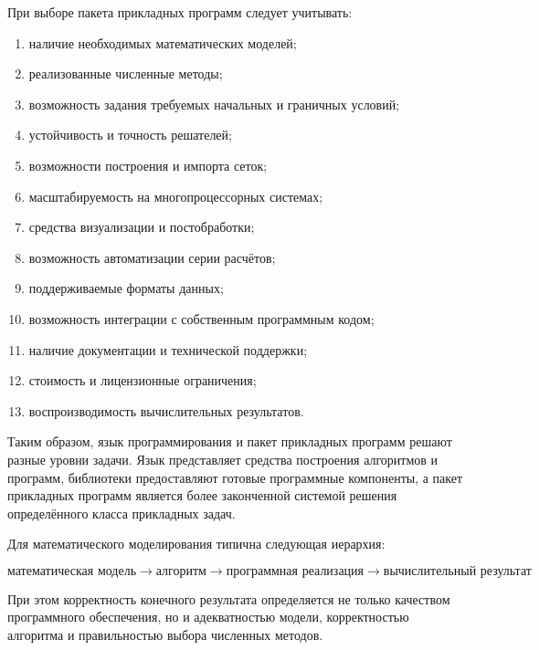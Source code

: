 При выборе пакета прикладных программ следует учитывать:
\begin{enumerate}
	\item наличие необходимых математических моделей;
	\item реализованные численные методы;
	\item возможность задания требуемых начальных и граничных условий;
	\item устойчивость и точность решателей;
	\item возможности построения и импорта сеток;
	\item масштабируемость на многопроцессорных системах;
	\item средства визуализации и постобработки;
	\item возможность автоматизации серии расчётов;
	\item поддерживаемые форматы данных;
	\item возможность интеграции с собственным программным кодом;
	\item наличие документации и технической поддержки;
	\item стоимость и лицензионные ограничения;
	\item воспроизводимость вычислительных результатов.
\end{enumerate}

Таким образом, язык программирования и пакет прикладных программ решают разные уровни задачи. Язык представляет средства построения алгоритмов и программ, библиотеки предоставляют готовые программные компоненты, а пакет прикладных программ является более законченной системой решения определённого класса прикладных задач.

Для математического моделирования типична следующая иерархия:

\[
\boxed{
	\text{математическая модель}
	\rightarrow
	\text{алгоритм}
	\rightarrow
	\text{программная реализация}
	\rightarrow
	\text{вычислительный результат}
}
\]

При этом корректность конечного результата определяется не только качеством программного обеспечения, но и адекватностью модели, корректностью алгоритма и правильностью выбора численных методов.

\newpage